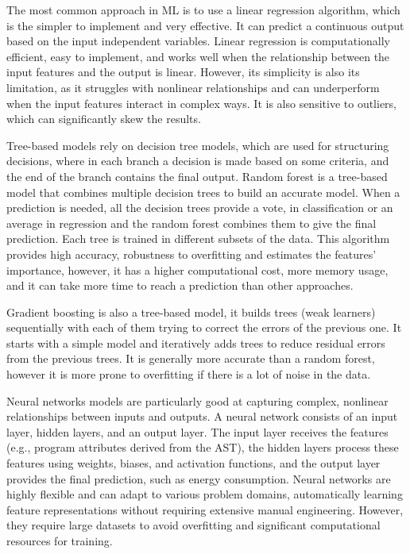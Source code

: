 The most common approach in ML is to use a linear regression algorithm, which is the simpler to implement and very effective. It can predict a continuous output based on the input independent variables. Linear regression is computationally efficient, easy to implement, and works well when the relationship between the input features and the output is linear. However, its simplicity is also its limitation, as it struggles with nonlinear relationships and can underperform when the input features interact in complex ways. It is also sensitive to outliers, which can significantly skew the results.

Tree-based models rely on decision tree models, which are used for structuring decisions, where in each branch a decision is made based on some criteria, and the end of the branch contains the final output. Random forest is a tree-based model that combines multiple decision trees to build an accurate model. When a prediction is needed, all the decision trees provide a vote, in classification or an average in regression and the random forest combines them to give the final prediction. Each tree is trained in different subsets of the data. This algorithm provides high accuracy, robustness to overfitting and estimates the features' importance, however, it has a higher computational cost, more memory usage, and it can take more time to reach a prediction than other approaches.

Gradient boosting is also a tree-based model, it builds trees (weak learners) sequentially with each of them trying to correct the errors of the previous one. It starts with a simple model and iteratively adds trees to reduce residual errors from the previous trees. It is generally more accurate than a random forest, however it is more prone to overfitting if there is a lot of noise in the data.

Neural networks models are particularly good at capturing complex, nonlinear relationships between inputs and outputs. A neural network consists of an input layer, hidden layers, and an output layer. The input layer receives the features (e.g., program attributes derived from the AST), the hidden layers process these features using weights, biases, and activation functions, and the output layer provides the final prediction, such as energy consumption. Neural networks are highly flexible and can adapt to various problem domains, automatically learning feature representations without requiring extensive manual engineering. However, they require large datasets to avoid overfitting and significant computational resources for training.

